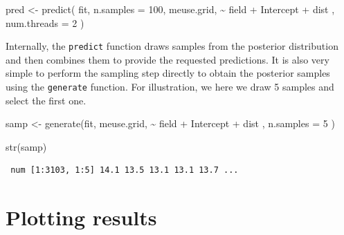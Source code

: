 \documentclass[
  a4paper,
]{article}
\newenvironment{Shaded}{\begin{snugshade}}{\end{snugshade}}
\newcommand{\AttributeTok}[1]{\textcolor[rgb]{0.40,0.45,0.13}{#1}}
\newcommand{\DecValTok}[1]{\textcolor[rgb]{0.68,0.00,0.00}{#1}}
\newcommand{\FunctionTok}[1]{\textcolor[rgb]{0.28,0.35,0.67}{#1}}
\newcommand{\NormalTok}[1]{\textcolor[rgb]{0.00,0.23,0.31}{#1}}
\newcommand{\OtherTok}[1]{\textcolor[rgb]{0.00,0.23,0.31}{#1}}
\newcommand{\SpecialCharTok}[1]{\textcolor[rgb]{0.37,0.37,0.37}{#1}}
\begin{document}
\begin{Shaded}
\begin{Highlighting}[]
\NormalTok{pred }\OtherTok{\textless{}{-}} \FunctionTok{predict}\NormalTok{(}
\NormalTok{  fit,}
  \AttributeTok{n.samples =} \DecValTok{100}\NormalTok{,}
\NormalTok{  meuse.grid,}
  \SpecialCharTok{\textasciitilde{}}\NormalTok{ field }\SpecialCharTok{+}\NormalTok{ Intercept }\SpecialCharTok{+}\NormalTok{ dist ,}
  \AttributeTok{num.threads =} \DecValTok{2}
\NormalTok{)}
\end{Highlighting}
\end{Shaded}

Internally, the \texttt{predict} function draws samples from the
posterior distribution and then combines them to provide the requested
predictions. It is also very simple to perform the sampling step
directly to obtain the posterior samples using the \texttt{generate}
function. For illustration, we here we draw 5 samples and select the
first one.

\begin{Shaded}
\begin{Highlighting}[]
\NormalTok{samp }\OtherTok{\textless{}{-}} \FunctionTok{generate}\NormalTok{(fit, }
\NormalTok{                 meuse.grid,}
                 \SpecialCharTok{\textasciitilde{}}\NormalTok{ field }\SpecialCharTok{+}\NormalTok{ Intercept }\SpecialCharTok{+}\NormalTok{ dist ,}
                 \AttributeTok{n.samples =} \DecValTok{5}
\NormalTok{)}

\FunctionTok{str}\NormalTok{(samp)}
\end{Highlighting}
\end{Shaded}

\begin{verbatim}
 num [1:3103, 1:5] 14.1 13.5 13.1 13.1 13.7 ...
\end{verbatim}

\begin{Shaded}
\end{Shaded}

\hypertarget{plotting-results}{%
\section{Plotting results}\label{plotting-results}}
\end{document}
